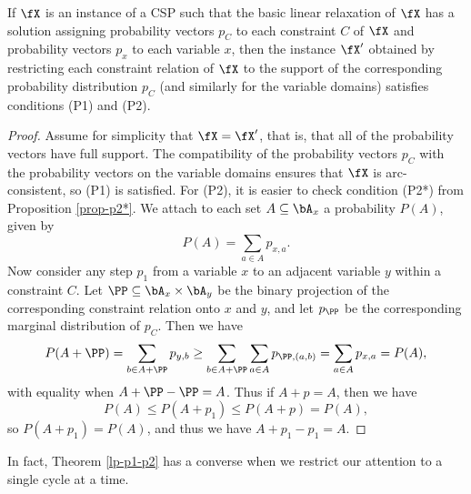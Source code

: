 \begin{thm}\label{lp-p1-p2} If $\fX$ is an instance of a CSP such that the basic linear relaxation of $\fX$ has a solution assigning probability vectors $p_C$ to each constraint $C$ of $\fX$ and probability vectors $p_x$ to each variable $x$, then the instance $\fX'$ obtained by restricting each constraint relation of $\fX$ to the support of the corresponding probability distribution $p_C$ (and similarly for the variable domains) satisfies conditions (P1) and (P2).
\end{thm}
\begin{proof} Assume for simplicity that $\fX = \fX'$, that is, that all of the probability vectors have full support. The compatibility of the probability vectors $p_C$ with the probability vectors on the variable domains ensures that $\fX$ is arc-consistent, so (P1) is satisfied. For (P2), it is easier to check condition (P2*) from Proposition \ref{prop-p2*}. We attach to each set $A \subseteq \bA_x$ a probability $P(A)$, given by
\[
P(A) = \sum_{a \in A} p_{x,a}.
\]
Now consider any step $p_1$ from a variable $x$ to an adjacent variable $y$ within a constraint $C$. Let $\PP \subseteq \bA_x \times \bA_y$ be the binary projection of the corresponding constraint relation onto $x$ and $y$, and let $p_\PP$ be the corresponding marginal distribution of $p_C$. Then we have
\[
P(A + \PP) = \sum_{b \in A+\PP} p_{y,b} \ge \sum_{b \in A+\PP} \sum_{a \in A} p_{\PP,(a,b)} = \sum_{a \in A} p_{x,a} = P(A),
\]
with equality when $A + \PP - \PP = A$. Thus if $A + p = A$, then we have
\[
P(A) \le P(A+p_1) \le P(A+p) = P(A),
\]
so $P(A+p_1) = P(A)$, and thus we have $A + p_1 - p_1 = A$.
\end{proof}

In fact, Theorem \ref{lp-p1-p2} has a converse when we restrict our attention to a single cycle at a time.

